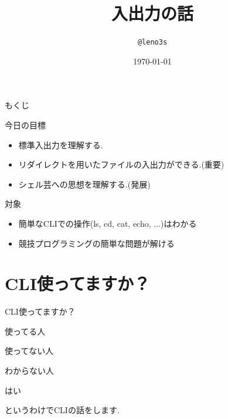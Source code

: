 \documentclass[uplatex, dvipdfmx, unicode]{beamer}
\title{入出力の話}
\author{\texttt{@leno3s}}
\date{\today}
\institute{\url{leno3s.net}}
\begin{document}
\maketitle

\begin{frame}{もくじ}
  \tableofcontents
\end{frame}

\begin{frame}{今日の目標}
  \begin{itemize}
    \item{標準入出力を理解する.}
    \item{リダイレクトを用いたファイルの入出力ができる.(重要)}
    \item{シェル芸への思想を理解する.(発展)}
  \end{itemize}
  

\end{frame}

\begin{frame}{対象}
  \begin{itemize}
    \item{簡単なCLIでの操作(ls, cd, cat, echo, ...)はわかる}
    \item{競技プログラミングの簡単な問題が解ける}
  \end{itemize}

\end{frame}

\section{CLI使ってますか？}
\begin{frame}
  \centering
  \Huge{CLI使ってますか？}
\end{frame}

\begin{frame}
  \centering
  \Huge{使ってる人\faHandPaperO}
\end{frame}

\begin{frame}
  \centering
  \Huge{使ってない人\faHandPaperO}
\end{frame}

\begin{frame}
  \centering
  \Huge{わからない人\faHandPaperO}
\end{frame}

\begin{frame}
  \centering
  \Huge{はい}
\end{frame}

\begin{frame}
  というわけでCLIの話をします.
\end{frame}
\end{document}
